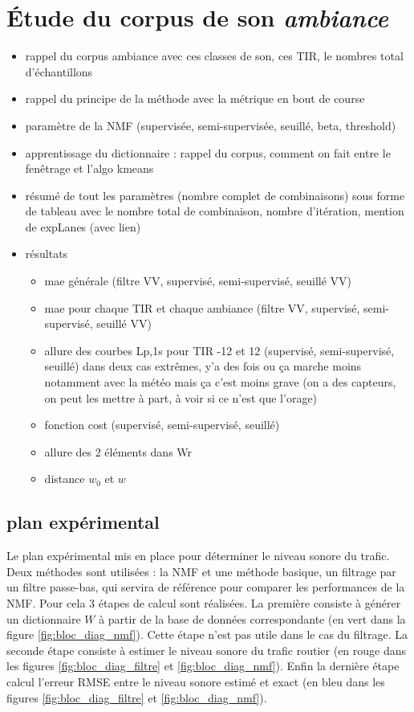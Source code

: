 
\chapter{\'Etude du corpus de son \textit{ambiance}}

\begin{itemize}
\item rappel du corpus ambiance avec ces classes de son, ces TIR, le nombres total d'échantillons
\item rappel du principe de la méthode avec la métrique en bout de course
\item paramètre de la NMF (supervisée, semi-supervisée, seuillé, beta, threshold)
\item apprentissage du dictionnaire : rappel du corpus, comment on fait entre le fenêtrage et l'algo kmeans
\item résumé de tout les paramètres (nombre complet de combinaisons) sous forme de tableau avec le nombre total de combinaison, nombre d'itération, mention de expLanes (avec lien)
\item résultats
\begin{itemize}
\item mae générale (filtre VV, supervisé, semi-supervisé, seuillé VV)
\item mae pour chaque TIR et chaque ambiance (filtre VV, supervisé, semi-supervisé, seuillé VV)
\item allure des courbes Lp,1s pour TIR -12 et 12 (supervisé, semi-supervisé, seuillé) dans deux cas extrêmes, y'a des fois ou ça marche moins notamment avec la météo mais ça c'est moins grave (on a des capteurs, on peut les mettre à part, à voir si ce n'est que l'orage)
\item fonction cost (supervisé, semi-supervisé, seuillé)
\item allure des 2 éléments dans Wr
\item distance $w_0$ et $w$
\end{itemize}

\end{itemize}

\section{plan expérimental}

Le plan expérimental mis en place pour déterminer le niveau sonore du trafic. Deux méthodes sont utilisées : la NMF et une méthode basique, un filtrage par un filtre passe-bas, qui servira de référence pour comparer les performances de la NMF. Pour cela 3 étapes de calcul sont réalisées. La première consiste à générer un dictionnaire $W$ à partir de la base de données correspondante (en vert dans la figure \ref{fig:bloc_diag_nmf}). Cette étape n'est pas utile dans le cas du filtrage. La seconde étape consiste à estimer le niveau sonore du trafic routier (en rouge dans les figures \ref{fig:bloc_diag_filtre} et \ref{fig:bloc_diag_nmf}). Enfin la dernière étape calcul l'erreur RMSE entre le niveau sonore estimé et exact (en bleu dans les figures \ref{fig:bloc_diag_filtre} et \ref{fig:bloc_diag_nmf}). \\

